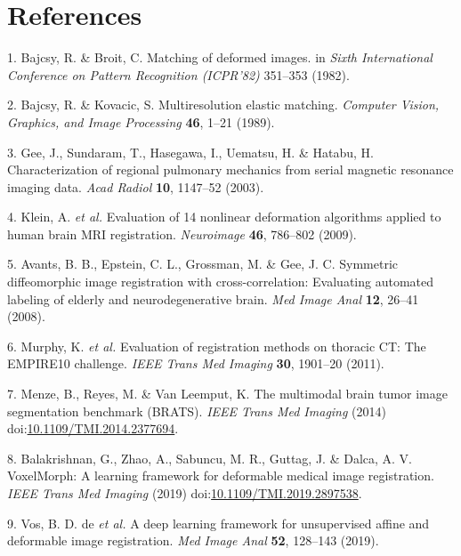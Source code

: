 \documentclass[12pt,]{article}
\begin{document}
\hypertarget{references}{%
\section*{References}\label{references}}

\hypertarget{refs}{}
\leavevmode\hypertarget{ref-Bajcsy:1982aa}{}%
1. Bajcsy, R. \& Broit, C. Matching of deformed images. in \emph{Sixth
International Conference on Pattern Recognition (ICPR'82)} 351--353
(1982).

\leavevmode\hypertarget{ref-Bajcsy:1989aa}{}%
2. Bajcsy, R. \& Kovacic, S. Multiresolution elastic matching.
\emph{Computer Vision, Graphics, and Image Processing} \textbf{46},
1--21 (1989).

\leavevmode\hypertarget{ref-Gee:2003aa}{}%
3. Gee, J., Sundaram, T., Hasegawa, I., Uematsu, H. \& Hatabu, H.
Characterization of regional pulmonary mechanics from serial magnetic
resonance imaging data. \emph{Acad Radiol} \textbf{10}, 1147--52 (2003).

\leavevmode\hypertarget{ref-Klein:2009aa}{}%
4. Klein, A. \emph{et al.} Evaluation of 14 nonlinear deformation
algorithms applied to human brain MRI registration. \emph{Neuroimage}
\textbf{46}, 786--802 (2009).

\leavevmode\hypertarget{ref-Avants:2008aa}{}%
5. Avants, B. B., Epstein, C. L., Grossman, M. \& Gee, J. C. Symmetric
diffeomorphic image registration with cross-correlation: Evaluating
automated labeling of elderly and neurodegenerative brain. \emph{Med
Image Anal} \textbf{12}, 26--41 (2008).

\leavevmode\hypertarget{ref-Murphy:2011aa}{}%
6. Murphy, K. \emph{et al.} Evaluation of registration methods on
thoracic CT: The EMPIRE10 challenge. \emph{IEEE Trans Med Imaging}
\textbf{30}, 1901--20 (2011).

\leavevmode\hypertarget{ref-Menze:2014aa}{}%
7. Menze, B., Reyes, M. \& Van Leemput, K. The multimodal brain tumor
image segmentation benchmark (BRATS). \emph{IEEE Trans Med Imaging}
(2014)
doi:\href{https://doi.org/10.1109/TMI.2014.2377694}{10.1109/TMI.2014.2377694}.

\leavevmode\hypertarget{ref-Balakrishnan:2019aa}{}%
8. Balakrishnan, G., Zhao, A., Sabuncu, M. R., Guttag, J. \& Dalca, A.
V. VoxelMorph: A learning framework for deformable medical image
registration. \emph{IEEE Trans Med Imaging} (2019)
doi:\href{https://doi.org/10.1109/TMI.2019.2897538}{10.1109/TMI.2019.2897538}.

\leavevmode\hypertarget{ref-Vos:2019wr}{}%
9. Vos, B. D. de \emph{et al.} A deep learning framework for
unsupervised affine and deformable image registration. \emph{Med Image
Anal} \textbf{52}, 128--143 (2019).
\end{document}

